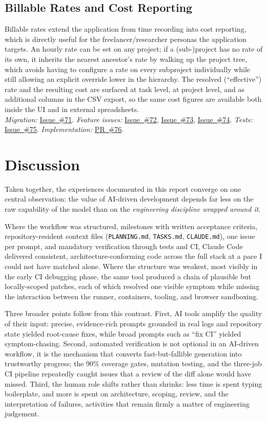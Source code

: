 \documentclass[11pt,a4paper]{article}
\newcommand{\repourl}{https://github.com/se2p-classrooms/final-project-ayoubalila}
\newcommand{\ghissue}[1]{\href{\repourl/issues/#1}{Issue~\##1}}
\newcommand{\ghpr}[1]{\href{\repourl/pull/#1}{PR~\##1}}
\begin{document}
\subsection{Billable Rates and Cost Reporting}
Billable rates extend the application from time recording into cost reporting, which is directly useful for the freelancer/researcher personas the application targets. An hourly rate can be set on any project; if a (sub-)project has no rate of its own, it inherits the nearest ancestor's rate by walking up the project tree, which avoids having to configure a rate on every subproject individually while still allowing an explicit override lower in the hierarchy. The resolved (``effective'') rate and the resulting cost are surfaced at task level, at project level, and as additional columns in the CSV export, so the same cost figures are available both inside the UI and in external spreadsheets.
\\[2pt]
\textit{Migration:} \ghissue{71}. \textit{Feature issues:} \ghissue{72}, \ghissue{73}, \ghissue{74}. \textit{Tests:} \ghissue{75}. \textit{Implementation:} \ghpr{76}.

\newpage
\section{Discussion}

Taken together, the experiences documented in this report converge on one central observation: the value of AI-driven development depends far less on the raw capability of the model than on the \emph{engineering discipline wrapped around it}.

Where the workflow was structured, milestones with written acceptance criteria, repository-resident context files (\texttt{PLANNING.md}, \texttt{TASKS.md}, \texttt{CLAUDE.md}), one issue per prompt, and mandatory verification through tests and CI, Claude Code delivered consistent, architecture-conforming code across the full stack at a pace I could not have matched alone. Where the structure was weakest, most visibly in the early CI debugging phase, the same tool produced a chain of plausible but locally-scoped patches, each of which resolved one visible symptom while missing the interaction between the runner, containers, tooling, and browser sandboxing.

Three broader points follow from this contrast. First, AI tools amplify the quality of their input: precise, evidence-rich prompts grounded in real logs and repository state yielded root-cause fixes, while broad prompts such as ``fix CI'' yielded symptom-chasing. Second, automated verification is not optional in an AI-driven workflow, it is the mechanism that converts fast-but-fallible generation into trustworthy progress; the 90\% coverage gates, mutation testing, and the three-job CI pipeline repeatedly caught issues that a review of the diff alone would have missed. Third, the human role shifts rather than shrinks: less time is spent typing boilerplate, and more is spent on architecture, scoping, review, and the interpretation of failures, activities that remain firmly a matter of engineering judgement.
\end{document}
